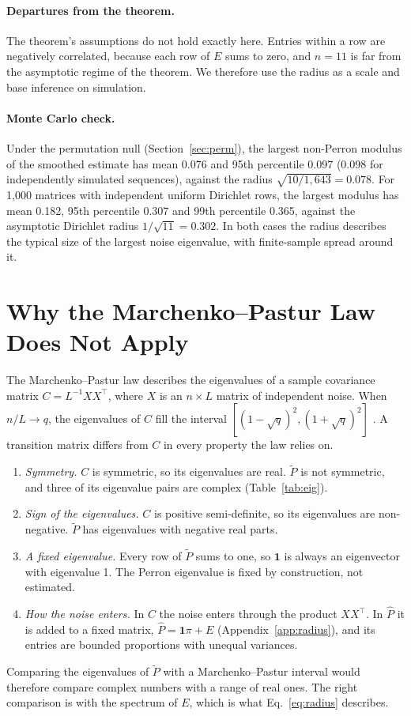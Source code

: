 \documentclass[11pt]{article}
\begin{document}
\paragraph{Departures from the theorem.} The theorem's assumptions do not hold exactly here. Entries within a row are negatively correlated, because each row of $E$ sums to zero, and $n = 11$ is far from the asymptotic regime of the theorem. We therefore use the radius as a scale and base inference on simulation.

\paragraph{Monte Carlo check.} Under the permutation null (Section~\ref{sec:perm}), the largest non-Perron modulus of the smoothed estimate has mean 0.076 and 95th percentile 0.097 (0.098 for independently simulated sequences), against the radius $\sqrt{10/1{,}643} = 0.078$. For 1{,}000 matrices with independent uniform Dirichlet rows, the largest modulus has mean 0.182, 95th percentile 0.307 and 99th percentile 0.365, against the asymptotic Dirichlet radius $1/\sqrt{11} = 0.302$. In both cases the radius describes the typical size of the largest noise eigenvalue, with finite-sample spread around it.

\clearpage
\section{Why the Marchenko--Pastur Law Does Not Apply}
\label{app:mp}

The Marchenko--Pastur law describes the eigenvalues of a sample covariance matrix $C = L^{-1}XX^\top$, where $X$ is an $n \times L$ matrix of independent noise. When $n/L \to q$, the eigenvalues of $C$ fill the interval $[(1-\sqrt q)^2, (1+\sqrt q)^2]$ \cite{marchenkopastur1967}. A transition matrix differs from $C$ in every property the law relies on.
\begin{enumerate}[label=\arabic*.]
\item \emph{Symmetry.} $C$ is symmetric, so its eigenvalues are real. $\tilde P$ is not symmetric, and three of its eigenvalue pairs are complex (Table~\ref{tab:eig}).
\item \emph{Sign of the eigenvalues.} $C$ is positive semi-definite, so its eigenvalues are non-negative. $\tilde P$ has eigenvalues with negative real parts.
\item \emph{A fixed eigenvalue.} Every row of $\tilde P$ sums to one, so $\mathbf 1$ is always an eigenvector with eigenvalue 1. The Perron eigenvalue is fixed by construction, not estimated.
\item \emph{How the noise enters.} In $C$ the noise enters through the product $XX^\top$. In $\hat P$ it is added to a fixed matrix, $\hat P = \mathbf 1\pi + E$ (Appendix~\ref{app:radius}), and its entries are bounded proportions with unequal variances.
\end{enumerate}
Comparing the eigenvalues of $\tilde P$ with a Marchenko--Pastur interval would therefore compare complex numbers with a range of real ones. The right comparison is with the spectrum of $E$, which is what Eq.~\eqref{eq:radius} describes.
\end{document}
